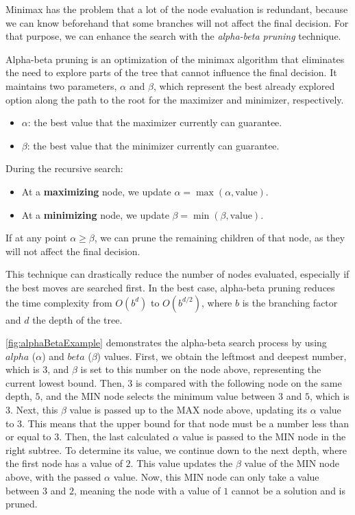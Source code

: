 Minimax has the problem that a lot of the node evaluation is redundant, because we can know beforehand that some branches will not affect the final decision. For that purpose, we can enhance the search with the \textit{alpha-beta pruning} technique. 

Alpha-beta pruning is an optimization of the minimax algorithm that eliminates the need to explore parts of the tree that cannot influence the final decision. It maintains two parameters, \(\alpha\) and \(\beta\), which represent the best already explored option along the path to the root for the maximizer and minimizer, respectively.

\begin{itemize}
    \item \(\alpha\): the best value that the maximizer currently can guarantee.
    \item \(\beta\): the best value that the minimizer currently can guarantee.
\end{itemize}

During the recursive search:
\begin{itemize}
    \item At a \textbf{maximizing} node, we update \(\alpha = \max(\alpha, \text{value})\).
    \item At a \textbf{minimizing} node, we update \(\beta = \min(\beta, \text{value})\).
\end{itemize}

If at any point \(\alpha \geq \beta\), we can prune the remaining children of that node, as they will not affect the final decision.

\vspace{1em}

This technique can drastically reduce the number of nodes evaluated, especially if the best moves are searched first. In the best case, alpha-beta pruning reduces the time complexity from \(O(b^d)\) to \(O(b^{d/2})\), where \(b\) is the branching factor and \(d\) the depth of the tree.

\vspace{1em}

\noindent\cref{fig:alphaBetaExample} demonstrates the alpha-beta search process by using $alpha$ ($\alpha$) and $beta$ ($\beta$) values. First, we obtain the leftmost and deepest number, which is $3$, and $\beta$ is set to this number on the node above, representing the current lowest bound. Then, $3$ is compared with the following node on the same depth, $5$, and the MIN node selects the minimum value between $3$ and $5$, which is $3$. Next, this $\beta$ value is passed up to the MAX node above, updating its $\alpha$ value to $3$. This means that the upper bound for that node must be a number less than or equal to $3$. Then, the last calculated $\alpha$ value is passed to the MIN node in the right subtree. To determine its value, we continue down to the next depth, where the first node has a value of $2$. This value updates the $\beta$ value of the MIN node above, with the passed $\alpha$ value. Now, this MIN node can only take a value between $3$ and $2$, meaning the node with a value of $1$ cannot be a solution and is pruned.

